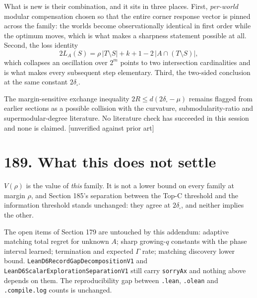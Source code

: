 \documentclass[9pt,twocolumn]{article}
\newcommand{\eclass}[1]{\textsf{[#1]}}
\renewcommand{\_}{\CIGunderscore\allowbreak}
\begin{document}
What is new is their combination, and it sits in three places. First, \emph{per-world} modular compensation chosen so that the entire corner response vector is pinned across the family: the worlds become observationally identical in first order while the optimum moves, which is what makes a sharpness statement possible at all. Second, the loss identity
\[ 2L_A(S)=\rho\,|T\setminus S|+k+1-2\,|A\cap(T\setminus S)| , \]
which collapses an oscillation over $2^{m}$ points to two intersection cardinalities and is what makes every subsequent step elementary. Third, the two-sided conclusion at the same constant $2\delta_\square$.

The margin-sensitive exchange inequality $2R\le d(2\delta_\square-\mu)$ remains flagged from earlier sections as a possible collision with the curvature, submodularity-ratio and supermodular-degree literature. No literature check has succeeded in this session and none is claimed. \eclass{unverified against prior art}

\section*{189. What this does not settle}

$V(\rho)$ is the value of \emph{this} family. It is not a lower bound on every family at margin $\rho$, and Section 185's separation between the Top-C threshold and the information threshold stands unchanged: they agree at $2\delta_\square$, and neither implies the other.

The open items of Section 179 are untouched by this addendum: adaptive matching total regret for unknown $A$; sharp growing-$q$ constants with the phase interval learned; termination and expected $\Gamma$ rate; matching discovery lower bound. \texttt{LeanD6RecordGapDecompositionV1} and \texttt{LeanD6ScalarExplorationSeparationV1} still carry \texttt{sorryAx} and nothing above depends on them. The reproducibility gap between \texttt{.lean}, \texttt{.olean} and \texttt{.compile.log} counts is unchanged.
\end{document}
